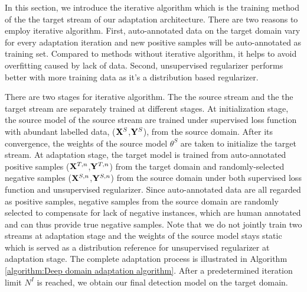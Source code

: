 \documentclass[runningheads]{llncs}
\begin{document}
In this section, we introduce the iterative algorithm which is the training method of the the target stream of our adaptation architecture. There are two reasons to employ iterative algorithm. First, auto-annotated data on the target domain vary for every adaptation iteration and new positive samples will be auto-annotated as training set. Compared to methods without iterative algorithm, it helps to avoid overfitting caused by lack of data. Second, unsupervised regularizer performs better with more training data as it's a distribution based regularizer.

There are two stages for iterative algorithm. The the source stream and the the target stream are separately trained at different stages. At initialization stage, the source model of the source stream are trained under supervised loss function with abundant labelled data, (${\bf X}^{S}$,${\bf Y}^{S}$), from the source domain. After its convergence, the weights of the source model $\theta^{S}$ are taken to initialize the target stream. At adaptation stage, the target model is trained from auto-annotated positive samples (${\bf X}^{T,n}$,${\bf Y}^{T,n}$) from the target domain and randomly-selected negative samples (${\bf X}^{S,n}$,${\bf Y}^{S,n}$) from the source domain under both supervised loss function and unsupervised regularizer. Since auto-annotated data are all regarded as positive samples, negative samples from the source domain are randomly selected to compensate for lack of negative instances, which are human annotated and can thus provide true negative samples. Note that we do not jointly train two streams at adaptation stage and the weights of the source model stays static which is served as a distribution reference for unsupervised regularizer at adaptation stage. The complete adaptation process is illustrated in Algorithm \ref{algorithm:Deep domain adaptation algorithm}. After a predetermined iteration limit $N^{I}$ is reached, we obtain our final detection model on the target domain.
\end{document}
